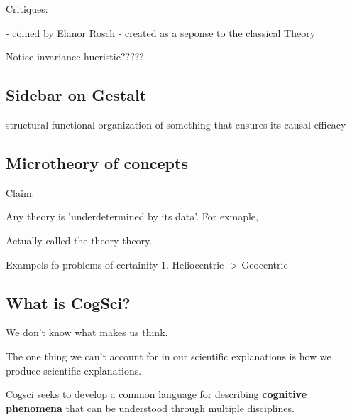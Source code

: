 \documentclass[twoside]{article}
\begin{document}
Critiques:

- coined by Elanor Rosch
- created as a seponse to the classical Theory

Notice invariance hueristic?????
\subsection{Sidebar on Gestalt}
structural functional organization of something that ensures its
causal efficacy


\subsection{Microtheory of concepts}
Claim:

Any theory is 'underdetermined by its data'. For exmaple,

Actually called the theory theory.

Exampels fo problems of certainity
1. Heliocentric -> Geocentric





\subsection{What is CogSci?}
We don't know what makes us think.

The one thing we can't account for in our scientific explanations is
how we produce scientific explanations.

Cogsci seeks to develop a common language for describing \textbf{cognitive phenomena}
that can be understood through multiple disciplines.
\end{document}
